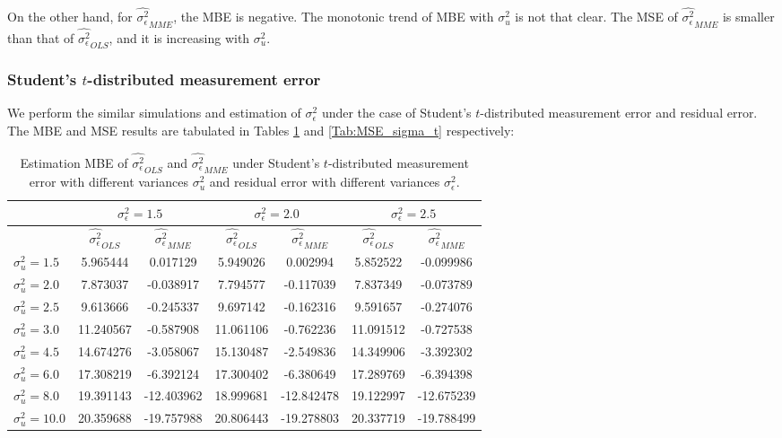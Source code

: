 \documentclass{article}
\begin{document}
On the other hand, for $\hat{\sigma^2_\epsilon}_{MME}$, the MBE is negative. The monotonic trend of MBE with $\sigma^2_u$ is not that clear. The MSE of $\hat{\sigma^2_\epsilon}_{MME}$ is smaller than that of $\hat{\sigma^2_\epsilon}_{OLS}$, and it is increasing with $\sigma^2_u$.


\subsubsection{Student's $t$-distributed measurement error}

We perform the similar simulations and estimation of $\sigma^2_\epsilon$ under the case of Student's $t$-distributed measurement error and residual error.
The MBE and MSE results are tabulated in Tables \ref{Tab:MBE_sigma_t} and \ref{Tab:MSE_sigma_t} respectively:

\begin{table}[ht]
    \centering
    \caption{Estimation MBE of $\hat{\sigma^2_\epsilon}_{OLS}$ and $\hat{\sigma^2_\epsilon}_{MME}$ under Student's $t$-distributed measurement error with different variances $\sigma^2_u$ and residual error with different variances $\sigma^2_\epsilon$.}
    \label{Tab:MBE_sigma_t}
    \begin{tabular}[t]{lcccccc}
        \hline
        &\multicolumn{2}{c}{$\sigma^2_\epsilon=1.5$}&\multicolumn{2}{c}{$\sigma^2_\epsilon=2.0$}&\multicolumn{2}{c}{$\sigma^2_\epsilon=2.5$}\\
        \hline
        &$\hat{\sigma^2_\epsilon}_{OLS}$&$\hat{\sigma^2_\epsilon}_{MME}$&$\hat{\sigma^2_\epsilon}_{OLS}$&
        $\hat{\sigma^2_\epsilon}_{MME}$&$\hat{\sigma^2_\epsilon}_{OLS}$&$\hat{\sigma^2_\epsilon}_{MME}$\\
        \hline
        $\sigma^2_u = 1.5$&5.965444&0.017129&5.949026&0.002994&5.852522&-0.099986\\
        $\sigma^2_u = 2.0$&7.873037&-0.038917&7.794577&-0.117039&7.837349&-0.073789\\
        $\sigma^2_u = 2.5$&9.613666&-0.245337&9.697142&-0.162316&9.591657&-0.274076\\
        $\sigma^2_u = 3.0$&11.240567&-0.587908&11.061106&-0.762236&11.091512&-0.727538\\
        $\sigma^2_u = 4.5$&14.674276&-3.058067&15.130487&-2.549836&14.349906&-3.392302\\
        $\sigma^2_u = 6.0$&17.308219&-6.392124&17.300402&-6.380649&17.289769&-6.394398\\
        $\sigma^2_u = 8.0$&19.391143&-12.403962&18.999681&-12.842478&19.122997&-12.675239\\
        $\sigma^2_u = 10.0$&20.359688&-19.757988&20.806443&-19.278803&20.337719&-19.788499\\
        \hline
    \end{tabular}
\end{table}
\end{document}
